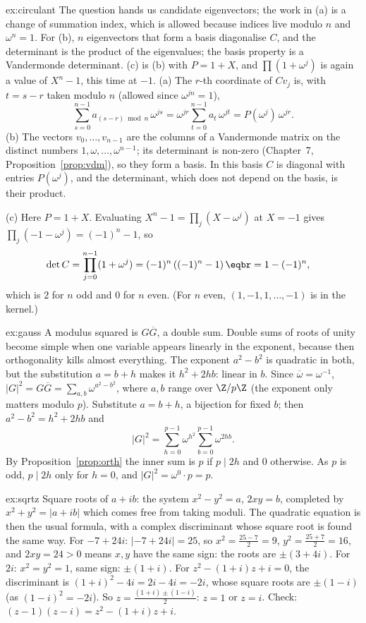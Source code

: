 \begin{solution}{ex:circulant}
\idea The question hands us candidate eigenvectors; the work in (a) is a change of summation index, which is allowed because indices live modulo $n$ and $\omega^n=1$. For (b), $n$ eigenvectors that form a basis diagonalise $C$, and the determinant is the product of the eigenvalues; the basis property is a Vandermonde determinant. (c) is (b) with $P=1+X$, and $\prod(1+\omega^j)$ is again a value of $X^n-1$, this time at $-1$.
\writeup (a) The $r$-th coordinate of $Cv_j$ is, with $t=s-r$ taken modulo $n$ (allowed since $\omega^{jn}=1$),
\[
\sum_{s=0}^{n-1}a_{(s-r)\bmod n}\,\omega^{js}=\omega^{jr}\sum_{t=0}^{n-1}a_t\,\omega^{jt}=P(\omega^j)\,\omega^{jr}.
\]
(b) The vectors $v_0,\dots,v_{n-1}$ are the columns of a Vandermonde matrix on the distinct numbers $1,\omega,\dots,\omega^{n-1}$; its determinant is non-zero (Chapter~7, Proposition~\ref{prop:vdm}),
so they form a basis. In this basis $C$ is diagonal with entries $P(\omega^j)$, and the determinant, which does not depend on the basis, is their product.

(c) Here $P=1+X$. Evaluating $X^n-1=\prod_j(X-\omega^j)$ at $X=-1$ gives $\prod_j(-1-\omega^j)=(-1)^n-1$, so
\[
\begin{aligned}\det C&=\prod_{j=0}^{n-1}(1+\omega^j)=(-1)^n\left((-1)^n-1\right)\eqbr=1-(-1)^n,\end{aligned}
\]
which is $2$ for $n$ odd and $0$ for $n$ even. (For $n$ even, $(1,-1,1,\dots,-1)$ is in the kernel.)
\end{solution}

\begin{solution}{ex:gauss}
\idea A modulus squared is $G\overline G$, a double sum. Double sums of roots of unity become simple when one variable appears linearly in the exponent, because then orthogonality kills almost everything. The exponent $a^2-b^2$ is quadratic in both, but the substitution $a=b+h$ makes it $h^2+2hb$: linear in $b$.
\writeup Since $\overline\omega=\omega^{-1}$, $|G|^2=G\overline G=\sum_{a,b}\omega^{a^2-b^2}$, where $a,b$ range over $\Z/p\Z$
(the exponent only matters modulo $p$). Substitute $a=b+h$, a bijection for fixed $b$; then $a^2-b^2=h^2+2hb$ and
\[
|G|^2=\sum_{h=0}^{p-1}\omega^{h^2}\sum_{b=0}^{p-1}\omega^{2hb}.
\]
By Proposition~\ref{prop:orth} the inner sum is $p$ if $p\mid2h$ and $0$ otherwise. As $p$ is odd, $p\mid2h$ only for
$h=0$, and $|G|^2=\omega^0\cdot p=p$.
\end{solution}

\begin{solution}{ex:sqrtz}
\idea Square roots of $a+ib$: the system $x^2-y^2=a$, $2xy=b$, completed by $x^2+y^2=|a+ib|$ which comes free from taking moduli. The quadratic equation is then the usual formula, with a complex discriminant whose square root is found the same way.
\writeup For $-7+24i$: $|{-7}+24i|=25$, so $x^2=\frac{25-7}2=9$, $y^2=\frac{25+7}2=16$, and $2xy=24>0$ means $x,y$ have the same sign: the roots are $\pm(3+4i)$. For $2i$: $x^2=y^2=1$, same sign: $\pm(1+i)$.
For $z^2-(1+i)z+i=0$, the discriminant is $(1+i)^2-4i=2i-4i=-2i$, whose square roots are $\pm(1-i)$ (as $(1-i)^2=-2i$). So $z=\frac{(1+i)\pm(1-i)}2$: $z=1$ or $z=i$. Check: $(z-1)(z-i)=z^2-(1+i)z+i$.
\end{solution}

